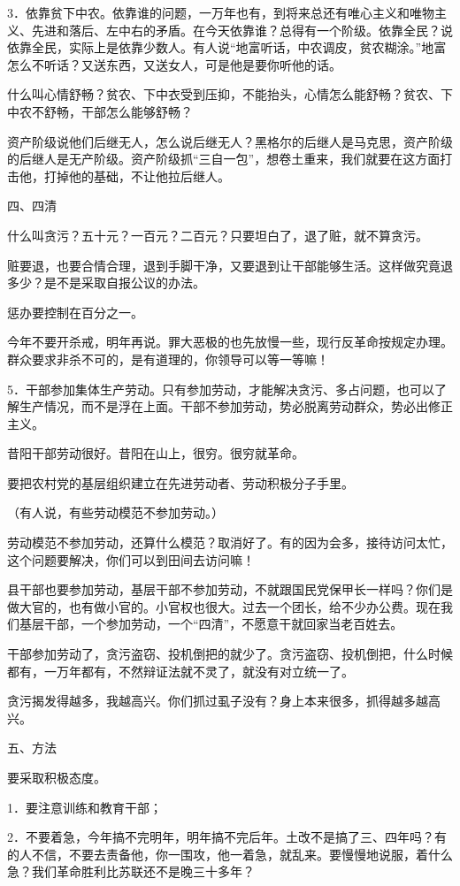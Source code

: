 3．依靠贫下中农。依靠谁的问题，一万年也有，到将来总还有唯心主义和唯物主义、先进和落后、左中右的矛盾。在今天依靠谁？总得有一个阶级。依靠全民？说依靠全民，实际上是依靠少数人。有人说“地富听话，中农调皮，贫农糊涂。”地富怎么不听话？又送东西，又送女人，可是他是要你听他的话。

什么叫心情舒畅？贫农、下中衣受到压抑，不能抬头，心情怎么能舒畅？贫农、下中农不舒畅，干部怎么能够舒畅？

资产阶级说他们后继无人，怎么说后继无人？黑格尔的后继人是马克思，资产阶级的后继人是无产阶级。资产阶级抓“三自一包”，想卷土重来，我们就要在这方面打击他，打掉他的基础，不让他拉后继人。

四、四清

什么叫贪污？五十元？一百元？二百元？只要坦白了，退了赃，就不算贪污。

赃要退，也要合情合理，退到手脚干净，又要退到让干部能够生活。这样做究竟退多少？是不是采取自报公议的办法。

惩办要控制在百分之一。

今年不要开杀戒，明年再说。罪大恶极的也先放慢一些，现行反革命按规定办理。群众要求非杀不可的，是有道理的，你领导可以等一等嘛！

5．干部参加集体生产劳动。只有参加劳动，才能解决贪污、多占问题，也可以了解生产情况，而不是浮在上面。干部不参加劳动，势必脱离劳动群众，势必出修正主义。

昔阳干部劳动很好。昔阳在山上，很穷。很穷就革命。

要把农村党的基层组织建立在先进劳动者、劳动积极分子手里。

（有人说，有些劳动模范不参加劳动。）

劳动模范不参加劳动，还算什么模范？取消好了。有的因为会多，接待访问太忙，这个问题要解决，你们可以到田间去访问嘛！

县干部也要参加劳动，基层干部不参加劳动，不就跟国民党保甲长一样吗？你们是做大官的，也有做小官的。小官权也很大。过去一个团长，给不少办公费。现在我们基层干部，一个参加劳动，一个“四清”，不愿意干就回家当老百姓去。

干部参加劳动了，贪污盗窃、投机倒把的就少了。贪污盗窃、投机倒把，什么时候都有，一万年都有，不然辩证法就不灵了，就没有对立统一了。

贪污揭发得越多，我越高兴。你们抓过虱子没有？身上本来很多，抓得越多越高兴。

五、方法

要采取积极态度。

1．要注意训练和教育干部；

2．不要着急，今年搞不完明年，明年搞不完后年。土改不是搞了三、四年吗？有的人不信，不要去责备他，你一围攻，他一着急，就乱来。要慢慢地说服，着什么急？我们革命胜利比苏联还不是晚三十多年？

